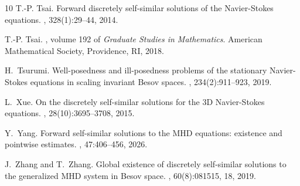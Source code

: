 \documentclass[12pt]{amsart}
\numberwithin{equation}{section}              %
\theoremstyle{remark}
\begin{document}
\begin{thebibliography}{10}
      	T.-P. Tsai.
      	\newblock Forward discretely self-similar solutions of the {N}avier-{S}tokes
      	equations.
      	, 328(1):29--44, 2014.
      	
      	T.-P. Tsai.
      	, volume 192 of {\em
      		Graduate Studies in Mathematics}.
      	\newblock American Mathematical Society, Providence, RI, 2018.
      	
      	H.~Tsurumi.
      	\newblock Well-posedness and ill-posedness problems of the stationary
      	{N}avier-{S}tokes equations in scaling invariant {B}esov spaces.
      	, 234(2):911--923, 2019.
      	
      	L.~Xue.
      	\newblock On the discretely self-similar solutions for the 3{D}
      	{N}avier-{S}tokes equations.
      	, 28(10):3695--3708, 2015.
      	
      	Y.~Yang.
      	\newblock Forward self-similar solutions to the {MHD} equations: existence and
      	pointwise estimates.
      	, 47:406--456, 2026.
      	
      	J.~Zhang and T.~Zhang.
      	\newblock Global existence of discretely self-similar solutions to the
      	generalized {MHD} system in {B}esov space.
      	, 60(8):081515, 18, 2019.
      	
      \end{thebibliography}
      
	
\end{document}
